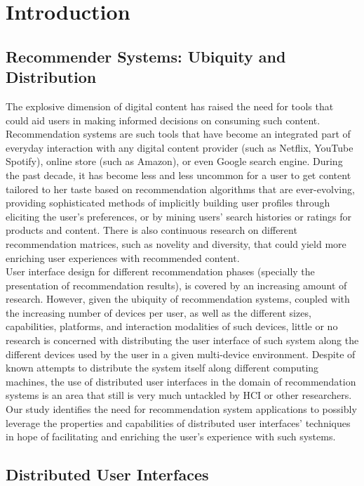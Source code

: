 \chapter{Introduction}\label{chapter:introduction}

\section{Recommender Systems: Ubiquity and Distribution}
The explosive dimension of digital content has raised the need for tools that
could aid users in making informed decisions on consuming such content.
Recommendation systems are such tools that have become an integrated part of
everyday interaction with any digital content provider (such as Netflix, YouTube
Spotify), online store (such as Amazon), or even Google search engine. During
the past decade, it has become less and less uncommon for a user to get content
tailored to her taste based on recommendation algorithms that are ever-evolving,
providing sophisticated methods of implicitly building user profiles
through eliciting the user's preferences, or by mining users' search histories
or ratings for products and content. There is also continuous research on
different recommendation matrices, such as novelity and diversity, that
could yield more enriching user experiences with recommended content.\\
User interface design for different recommendation phases
(specially the presentation of recommendation results), is covered by an
increasing amount of research. However, given the ubiquity of recommendation systems, coupled with the increasing number of devices per user, as well as the different sizes,
capabilities, platforms, and interaction modalities of such devices, little or
no research is concerned with distributing the user interface of such system
along the different devices used by the user in a given multi-device
environment. Despite of known attempts to distribute the system itself along
different computing machines, the use of distributed user interfaces in the
domain of recommendation systems is an area that still is very much untackled
by HCI or other researchers.\\
Our study identifies the need for recommendation system applications to possibly
leverage the properties and capabilities of distributed user interfaces'
techniques in hope of facilitating and enriching the user's experience with such systems.

\section{Distributed User Interfaces}
